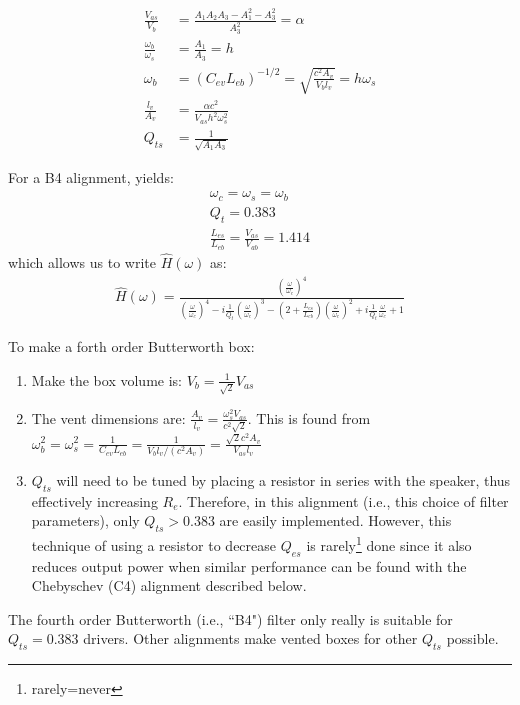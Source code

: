 \documentclass[10pt]{book}
\begin{document}
\begin{align}
\frac{V_{as}}{V_{b}}&=\frac{A_1A_2A_3-A_1^2-A_3^2}{A_3^2}=\alpha\label{eq:dimensions-start}\\
\frac{\omega_b}{\omega_s}&=\frac{A_1}{A_3}=h\\
\omega_b&=(C_{ev}L_{eb})^{-1/2}=\sqrt{ \frac{c^2A_v}{V_bl_v} } =h\omega_s\\
\frac{l_v}{A_v}&=\frac{\alpha c^2}{V_{as} h^2 \omega_s^2}\\
Q_{ts}&=\frac{1}{\sqrt{A_1A_3}}\label{eq:dimensions-end}
\end{align}

For a B4 alignment, yields:
\begin{align}
\omega_c=\omega_s=\omega_b\\
Q_t=0.383\\
\frac{L_{es}}{L_{eb}}=\frac{V_{as}}{V_{ab}}=1.414
\end{align}
which allows us to write $\hat{H}(\omega)$ as:
\begin{align}
\hat{H}(\omega)=\frac{\left(\frac{\omega}{\omega_c}\right)^4}
{\left(\frac{\omega}{\omega_c}\right)^4-i\frac{1}{Q_t}\left(\frac{\omega}{\omega_c}\right)^3-\left(2+\frac{L_{es}}{L_{eb}}\right)\left(\frac{\omega}{\omega_c}\right)^2+i\frac{1}{Q_t}\frac{\omega}{\omega_c}+1}
\end{align}

To make a forth order Butterworth box:
\begin{enumerate}
\item Make the box volume is: $V_b=\frac{1}{\sqrt{2}}V_{as}$
\item The vent dimensions are: $\frac{A_v}{l_v}=\frac{\omega_s^2 V_{as}}{c^2\sqrt{2}}$. This is found from $\omega_b^2=\omega_s^2=\frac{1}{C_{ev}L_{eb}}=\frac{1}{V_b l_v/(c^2 A_v)}=\frac{\sqrt{2}c^2 A_v}{V_{as}l_v}$
\item $Q_{ts}$ will need to be tuned by placing a resistor in series with the speaker, thus effectively increasing $R_e$. Therefore, in this alignment (i.e., this choice of filter parameters), only $Q_{ts}>0.383$ are easily implemented. However, this technique of using a resistor to decrease $Q_{es}$ is rarely\footnote{rarely=never} done since it also reduces output power when similar performance can be found with the Chebyschev (C4) alignment described below.
\end{enumerate}

The fourth order Butterworth (i.e., ``B4") filter only really is suitable for $Q_{ts}=0.383$ drivers. Other alignments make vented boxes for other $Q_{ts}$ possible.
\end{document}
